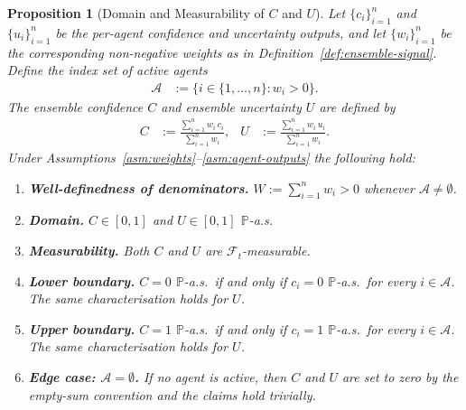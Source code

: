 \documentclass[12pt,openany]{book}
\newcommand{\calF}{\mathcal{F}}
\newcommand{\Prob}{\mathbb{P}}
\numberwithin{equation}{chapter}
\theoremstyle{plain}
\newtheorem{proposition}[theorem]{Proposition}
\theoremstyle{definition}
\theoremstyle{remark}
\numberwithin{equation}{chapter}
\theoremstyle{plain}
\begin{document}
\begin{proposition}[Domain and Measurability of $C$ and $U$]
\label{prop:CU-domain}
Let $\{c_i\}_{i=1}^{n}$ and $\{u_i\}_{i=1}^{n}$ be the
per-agent confidence and uncertainty outputs, and let
$\{w_i\}_{i=1}^{n}$ be the corresponding non-negative weights
as in Definition~\ref{def:ensemble-signal}.  Define the
index set of active agents
\begin{align}
  \mathcal{A} &:= \{i \in \{1,\ldots,n\} : w_i > 0\}.
\end{align}
The ensemble confidence $C$ and ensemble uncertainty $U$ are
defined by
\begin{align}
  C &:= \frac{\displaystyle\sum_{i=1}^{n} w_i\, c_i}
             {\displaystyle\sum_{i=1}^{n} w_i},
  &
  U &:= \frac{\displaystyle\sum_{i=1}^{n} w_i\, u_i}
             {\displaystyle\sum_{i=1}^{n} w_i}.
\end{align}
Under Assumptions~\ref{asm:weights}--\ref{asm:agent-outputs}
the following hold:
\begin{enumerate}
  \item \textbf{Well-definedness of denominators.}
    $\displaystyle W := \sum_{i=1}^{n} w_i > 0$ whenever
    $\mathcal{A} \neq \emptyset$.
  \item \textbf{Domain.}
    $C \in [0,1]$ and $U \in [0,1]$ $\Prob$-a.s.
  \item \textbf{Measurability.}
    Both $C$ and $U$ are $\calF_t$-measurable.
  \item \textbf{Lower boundary.}
    $C = 0$ $\Prob$-a.s.\ if and only if $c_i = 0$
    $\Prob$-a.s.\ for every $i \in \mathcal{A}$.
    The same characterisation holds for $U$.
  \item \textbf{Upper boundary.}
    $C = 1$ $\Prob$-a.s.\ if and only if $c_i = 1$
    $\Prob$-a.s.\ for every $i \in \mathcal{A}$.
    The same characterisation holds for $U$.
  \item \textbf{Edge case: $\mathcal{A} = \emptyset$.}
    If no agent is active, then $C$ and $U$ are set to zero
    by the empty-sum convention and the claims hold trivially.
\end{enumerate}
\end{proposition}
\end{document}
